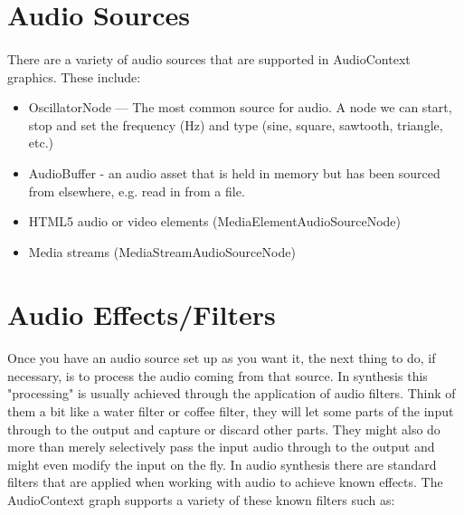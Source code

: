 \section{Audio Sources}
\paragraph{} There are a variety of audio sources that are supported in AudioContext graphics. These include:

\begin{itemize}
\item OscillatorNode — The most common source for audio. A node we can start, stop and set the frequency (Hz) and type (sine, square, sawtooth, triangle, etc.)
\item AudioBuffer - an audio asset that is held in memory but has been sourced from elsewhere, e.g. read in from a file.
\item HTML5 audio or video elements (MediaElementAudioSourceNode)
\item Media streams (MediaStreamAudioSourceNode)
\end{itemize}


\section{Audio Effects/Filters}
\paragraph{} Once you have an audio source set up as you want it, the next thing to do, if necessary, is to process the audio coming from that source. In synthesis this "processing" is usually achieved through the application of audio filters. Think of them a bit like a water filter or coffee filter, they will let some parts of the input through to the output and capture or discard other parts. They might also do more than merely selectively pass the input audio through to the output and might even modify the input on the fly. In audio synthesis there are standard filters that are applied when working with audio to achieve known effects. The AudioContext graph supports a variety of these known filters such as:

